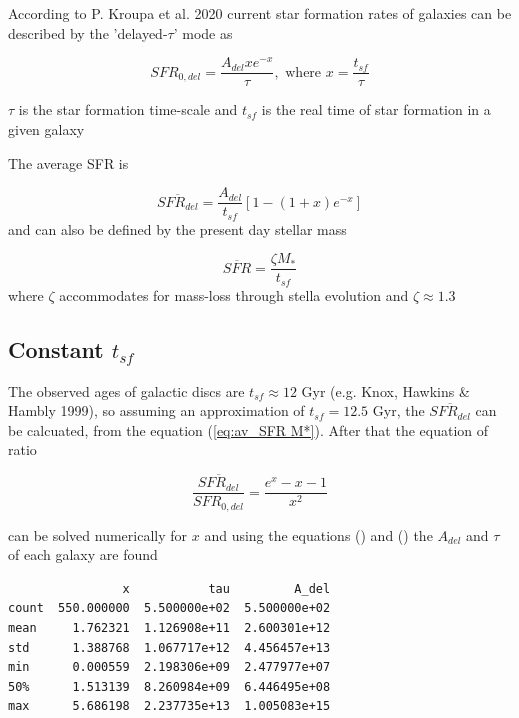 \documentclass[a4paper]{article}
\begin{document}
According to P. Kroupa et al. 2020 current star formation rates of galaxies can be described by the 'delayed-\(\tau\)' mode as


\begin{equation} \label{eq:SFR}
SFR_{0,del}=\frac{A_{del}xe^{-x}}{\tau},\text{ where } x=\frac{t_{sf}}{\tau}
\end{equation}


\(\tau\) is the star formation time-scale and \(t_{sf}\) is the real time of star formation in a given galaxy

The average SFR is

\begin{equation}\label{eq:av_SFR-x}
\overline{SFR_{del}}=\frac{A_{del}}{t_{sf}}[1-(1+x)e^{-x}]
\end{equation}
and can also be defined by the present day stellar mass

\begin{equation}\label{eq:av_SFR M*}
    \overline{SFR}=\frac{\zeta M_*}{t_{sf}}
\end{equation}
where \(\zeta\) accommodates for mass-loss through stella evolution and \(\zeta\approx 1.3\)

\subsection{Constant \(t_{sf}\)}
\label{sec:org4bfffb4}
The observed ages of galactic discs are \(t_{sf}\approx 12\) Gyr (e.g. Knox, Hawkins \& Hambly 1999), so assuming an approximation of \(t_{sf}=12.5\) Gyr, the \(\overline{SFR_{del}}\) can be calcuated, from the equation (\ref{eq:av_SFR M*}). After that the equation of ratio


\begin{equation} \label{eq:ratio}
    \frac{\overline{SFR_{del}}}{SFR_{0,del}}=\frac{e^x-x-1}{x^2}
\end{equation}

can be solved numerically for \(x\) and using the equations () and () the \(A_{del}\) and \(\tau\) of each galaxy are found

\begin{verbatim}
                x           tau         A_del
count  550.000000  5.500000e+02  5.500000e+02
mean     1.762321  1.126908e+11  2.600301e+12
std      1.388768  1.067717e+12  4.456457e+13
min      0.000559  2.198306e+09  2.477977e+07
50%      1.513139  8.260984e+09  6.446495e+08
max      5.686198  2.237735e+13  1.005083e+15
\end{verbatim}
\end{document}
